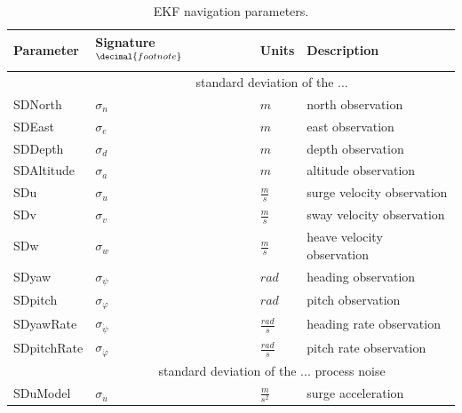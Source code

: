 \begin{table}
\centering
	\caption{EKF navigation parameters.}
	\label{tab:ekf-params}
\begin{tabular}{llll}
\toprule
Parameter      &     Signature $^{\decimal{footnote}}$     &     Units     &    Description  \\
\midrule
                         & \multicolumn{3}{c}{standard deviation of the ... } \\ 
\multirow{1}{*}{SDNorth} & \multirow{1}{*}{$\sigma_{n}$} & \multirow{1}{*}{$m$} & \multirow{1}{*}{north observation} \\
\multirow{1}{*}{SDEast}  & \multirow{1}{*}{$\sigma_{e}$} & \multirow{1}{*}{$m$} & \multirow{1}{*}{east observation} \\
\multirow{1}{*}{SDDepth} & \multirow{1}{*}{$\sigma_{d}$} & \multirow{1}{*}{$m$} & \multirow{1}{*}{depth observation} \\
\multirow{1}{*}{SDAltitude} & \multirow{1}{*}{$\sigma_{a}$} & \multirow{1}{*}{$m$} & \multirow{1}{*}{altitude observation} \\
\multirow{1}{*}{SDu} & \multirow{1}{*}{$\sigma_{u}$} & \multirow{1}{*}{$\frac{m}{s}$} & \multirow{1}{*}{surge velocity observation} \\
\multirow{1}{*}{SDv} & \multirow{1}{*}{$\sigma_{v}$} & \multirow{1}{*}{$\frac{m}{s}$} & \multirow{1}{*}{sway velocity observation} \\
\multirow{1}{*}{SDw} & \multirow{1}{*}{$\sigma_{w}$} & \multirow{1}{*}{$\frac{m}{s}$} & \multirow{1}{*}{heave velocity observation} \\
\multirow{1}{*}{SDyaw} & \multirow{1}{*}{$\sigma_{\psi}$} & \multirow{1}{*}{$rad$} & \multirow{1}{*}{heading observation} \\
\multirow{1}{*}{SDpitch} & \multirow{1}{*}{$\sigma_{\varphi}$} & \multirow{1}{*}{$rad$} & \multirow{1}{*}{pitch observation} \\
\multirow{1}{*}{SDyawRate} & \multirow{1}{*}{$\sigma_{\dot{\psi}}$} & \multirow{1}{*}{$\frac{rad}{s}$} & \multirow{1}{*}{heading rate observation} \\
\multirow{1}{*}{SDpitchRate} & \multirow{1}{*}{$\sigma_{\dot{\varphi}}$} & \multirow{1}{*}{$\frac{rad}{s}$} & \multirow{1}{*}{pitch rate observation} \\
\midrule
                         & \multicolumn{3}{c}{standard deviation of the ... process noise} \\
\multirow{1}{*}{SDuModel} & \multirow{1}{*}{$\sigma_{\dot{u}}$}  & \multirow{1}{*}{$\frac{m}{s^{2}}$} & \multirow{1}{*}{surge acceleration} \\

\end{tabular}
\end{table}

